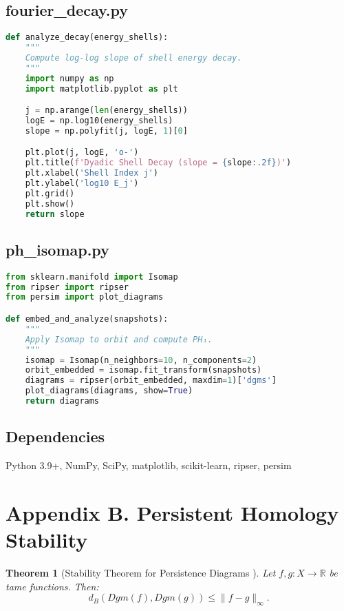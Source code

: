 \documentclass[11pt]{article}
\newtheorem{theorem}{Theorem}[section]
\theoremstyle{definition}
\begin{document}
\subsection*{fourier\_decay.py}
\begin{lstlisting}[language=Python]
def analyze_decay(energy_shells):
    """
    Compute log-log slope of shell energy decay.
    """
    import numpy as np
    import matplotlib.pyplot as plt

    j = np.arange(len(energy_shells))
    logE = np.log10(energy_shells)
    slope = np.polyfit(j, logE, 1)[0]

    plt.plot(j, logE, 'o-')
    plt.title(f'Dyadic Shell Decay (slope = {slope:.2f})')
    plt.xlabel('Shell Index j')
    plt.ylabel('log10 E_j')
    plt.grid()
    plt.show()
    return slope
\end{lstlisting}

\subsection*{ph\_isomap.py}
\begin{lstlisting}[language=Python]
from sklearn.manifold import Isomap
from ripser import ripser
from persim import plot_diagrams

def embed_and_analyze(snapshots):
    """
    Apply Isomap to orbit and compute PH₁.
    """
    isomap = Isomap(n_neighbors=10, n_components=2)
    orbit_embedded = isomap.fit_transform(snapshots)
    diagrams = ripser(orbit_embedded, maxdim=1)['dgms']
    plot_diagrams(diagrams, show=True)
    return diagrams
\end{lstlisting}

\subsection*{Dependencies}
Python 3.9+, NumPy, SciPy, matplotlib, scikit-learn, ripser, persim


\section{Appendix B. Persistent Homology Stability}
\label{sec:appendixB}

\begin{theorem}[Stability Theorem for Persistence Diagrams \cite{CohenSteiner2007}]
Let $f, g : X \to \mathbb{R}$ be tame functions. Then:
\[
d_B(Dgm(f), Dgm(g)) \le \|f - g\|_\infty.
\]
\end{theorem}
\end{document}
